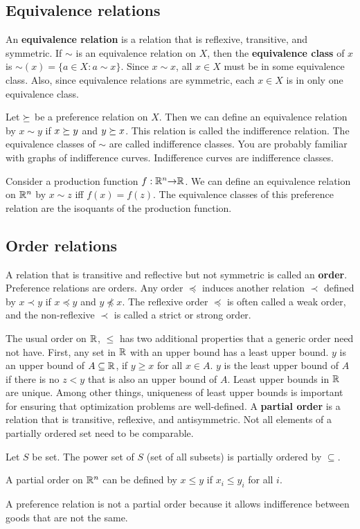 \subsection{Equivalence relations}
An \textbf{equivalence relation} is a relation that is reflexive,
transitive, and symmetric. If $\sim$ is an equivalence relation on
$X$, then the \textbf{equivalence class} of $x$ is $\sim(x) = \{ a
\in X: a \sim x \}$. Since $x \sim x$, all $x
\in X$ must be in some equivalence class. Also, since equivalence
relations are symmetric, each $x \in X$ is in only one equivalence
class. 
\begin{example}[Indifference]
  Let $\succeq$ be a preference relation on $X$. Then we can define an
  equivalence relation by $x \sim y$ if $x \succeq y$ and $y \succeq
  x$. This relation is called the indifference relation. The
  equivalence classes of $\sim$ are called indifference classes. You
  are probably familiar with graphs of indifference
  curves. Indifference curves are indifference classes. 
\end{example}
\begin{example}[Isoquants]
  Consider a production function $f: \mathbb{R}^n {\rightarrow} \mathbb{R}$. We can define an
  equivalence relation on $\mathbb{R}^n$ by $x \sim z$ iff $f(x) = f(z)$. The
  equivalence classes of this preference relation are the isoquants of
  the production function. 
\end{example}

\subsection{Order relations}
A relation that is transitive and reflective but not symmetric is
called an \textbf{order}. Preference relations are orders. Any order
$\preceq$ induces another relation $\prec$ defined by $x \prec y$ if
$x \preceq y$ and $y \npreceq x$. The reflexive order $\preceq$ is
often called a weak order, and the non-reflexive $\prec$ is called a
strict or strong order.  

The usual order on $\mathbb{R}$, $\leq$ has two additional properties that a
generic order need not have. First, any set in $\mathbb{R}$ with an upper
bound has a least upper bound. $y$ is an upper bound of $ A \subseteq
\mathbb{R}$, if $y \geq x$ for all $x \in A$. $y$ is the least upper bound of
$A$ if there is no $z < y$ that is also an upper bound of $A$. Least
upper bounds in $\mathbb{R}$ are unique. Among other things, uniqueness of
least upper bounds is important for ensuring that optimization
problems are well-defined. A \textbf{partial order} is a relation that
is transitive, reflexive, and antisymmetric. Not all elements of a
partially ordered set need to be comparable.  
\begin{example}
  Let $S$ be set. The power set of $S$ (set of all subsets) is
  partially ordered by $\subseteq$.
\end{example}
\begin{example}
  A partial order on $\mathbb{R}^n$ can be defined by $x \leq y$ if $x_i \leq
  y_i$ for all $i$.
\end{example}
A preference relation is not a partial order because it allows
indifference between goods that are not the same. 

